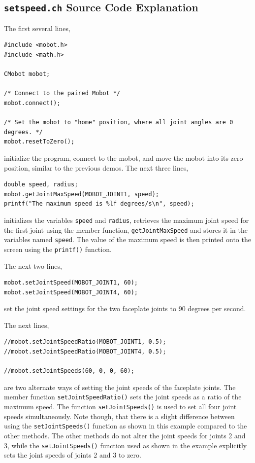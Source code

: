 \documentclass{article}
\begin{document}
\subsection{\texttt{setspeed.ch} Source Code Explanation}
The first several lines,
\begin{verbatim}
#include <mobot.h>
#include <math.h>

CMobot mobot;

/* Connect to the paired Mobot */
mobot.connect();

/* Set the mobot to "home" position, where all joint angles are 0 degrees. */
mobot.resetToZero();
\end{verbatim}
initialize the program, connect to the mobot, and move the mobot into its zero position,
similar to the previous demos. The next three lines,
\begin{verbatim}
double speed, radius;
mobot.getJointMaxSpeed(MOBOT_JOINT1, speed);
printf("The maximum speed is %lf degrees/s\n", speed);
\end{verbatim}
initializes the variables \texttt{speed} and \texttt{radius},
retrieves the maximum joint speed for the first joint using the member function,
\texttt{getJointMaxSpeed} and stores it in the variables named \texttt{speed}.
The value of the maximum speed is then printed onto the screen using the \texttt{printf()}
function.

The next two lines,
\begin{verbatim}
mobot.setJointSpeed(MOBOT_JOINT1, 60);
mobot.setJointSpeed(MOBOT_JOINT4, 60);
\end{verbatim}
set the joint speed settings for the two faceplate joints to 90 degrees per second.

The next lines, 
\begin{verbatim}
//mobot.setJointSpeedRatio(MOBOT_JOINT1, 0.5);
//mobot.setJointSpeedRatio(MOBOT_JOINT4, 0.5);

//mobot.setJointSpeeds(60, 0, 0, 60);
\end{verbatim}
are two alternate ways of setting the joint speeds of the faceplate joints. 
The member function \texttt{setJointSpeedRatio()} sets the joint speeds as a ratio of the 
maximum speed. The function \texttt{setJointSpeeds()} is used to set all four
joint speeds simultaneously. Note though, that there is a slight difference between
using the \texttt{setJointSpeeds()} function as shown in this example compared to the
other methods. The other methods do not alter the joint speeds for joints 2 and 3, while
the \texttt{setJointSpeeds()} function used as shown in the example explicitly sets
the joint speeds of joints 2 and 3 to zero. 
\end{document}
